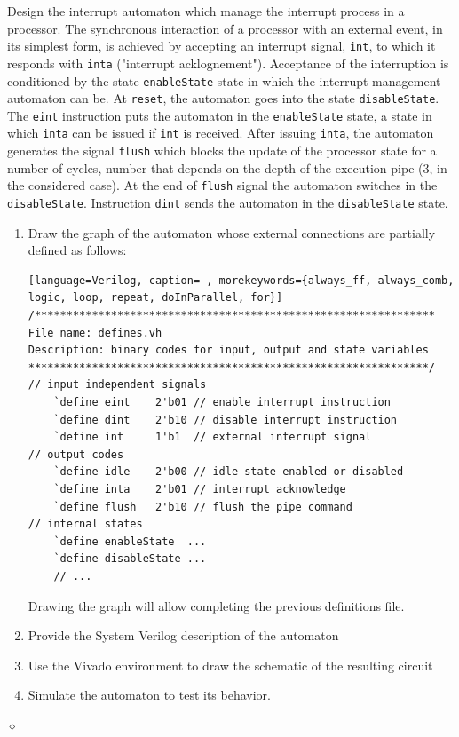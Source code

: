 \begin{problem}
Design the interrupt automaton which manage the interrupt process in a processor. The synchronous interaction of a processor with an external event, in its simplest form, is achieved by accepting an interrupt signal, {\tt int}, to which it responds with {\tt inta} ("interrupt acklognement"). Acceptance of the interruption is conditioned by the state {\tt enableState} state in which the interrupt management automaton can be. At {\tt reset}, the automaton goes into the state {\tt disableState}. The {\tt eint} instruction puts the automaton in the {\tt enableState} state, a state in which {\tt inta} can be issued if {\tt int} is received. After issuing {\tt inta}, the automaton generates the signal {\tt flush} which blocks the update of the processor state for a number of cycles, number that depends on the depth of the execution pipe (3, in the considered case). At the end of {\tt flush} signal the automaton switches in the  {\tt disableState}. Instruction {\tt dint} sends the automaton in the {\tt disableState} state.
\begin{enumerate}
    \item Draw the graph of the automaton whose external connections are partially defined as follows:
    {\em
{\small
\begin{shaded*}
\begin{lstlisting}[language=Verilog, caption= , morekeywords={always_ff, always_comb, logic, loop, repeat, doInParallel, for}]
/***************************************************************
File name: defines.vh
Description: binary codes for input, output and state variables
***************************************************************/
// input independent signals
    `define eint    2'b01 // enable interrupt instruction
    `define dint    2'b10 // disable interrupt instruction
    `define int     1'b1  // external interrupt signal
// output codes	
    `define idle    2'b00 // idle state enabled or disabled
    `define inta    2'b01 // interrupt acknowledge
    `define flush   2'b10 // flush the pipe command
// internal states
    `define enableState  ...
    `define disableState ...
    // ...
\end{lstlisting}
\end{shaded*}
}}
Drawing the graph will allow completing the previous definitions file.
    \item Provide the System Verilog description of the automaton
    \item Use the Vivado environment to draw the schematic of the resulting circuit
    \item Simulate the automaton to test its behavior.
\end{enumerate}

$\diamond$
\end{problem}


